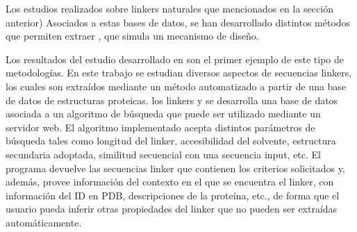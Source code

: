 












Los estudios realizados sobre linkers naturales que mencionados en la sección anterior) 
Asociados a estas bases de datos, se han desarrollado distintos métodos que permiten extraer  ,  que simula un mecanismo de diseño.

Los resultados del estudio desarrollado en \cite{george2002analysis} son el primer ejemplo de este tipo de metodologías.
En este trabajo se estudian diversos aspectos de secuencias linkers, los cuales son extraídos mediante un método automatizado a partir de una base de datos de estructuras proteicas. 
los linkers y se desarrolla una base de datos asociada a un algoritmo de búsqueda que puede ser utilizado mediante un servidor web\cite{linkerdbIBIVU}.
El algoritmo implementado acepta distintos parámetros de búsqueda tales como longitud del linker, accesibilidad del solvente, estructura secundaria adoptada, similitud secuencial con una secuencia input, etc.
El programa devuelve las secuencias linker que contienen los criterios solicitados y, además, provee información del contexto en el que se encuentra el linker, con información del ID en PDB, descripciones de la proteína, etc.,
de forma que el usuario pueda inferir otras propiedades del linker que no pueden ser extraídas automáticamente.

